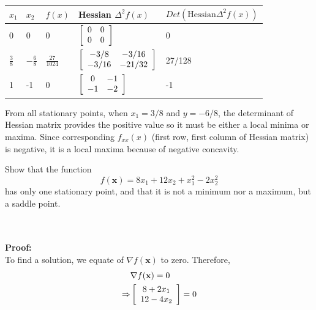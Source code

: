 \documentclass[a4paper,10pt]{article}
\begin{document}
\begin{enumerate}
\begin{center}
    \begin{tabular}{ | m{1em} | m{1em} | m{1cm} |  m{10em} | m{10em} | } 
      \hline
      $x_1$ & $x_2$ & $f(x)$ & Hessian $\Delta^2f(x)$ & $Det(\text{Hessian} \Delta^2f(x))$ \\ 
      \hline
      0 & 0 & 0 & $\left[\begin{array}{c c} 0  &0 \\ 0 &0 \end{array} \right]$ & 0 \\ 
      \hline
      $\frac{3}{8}$ &  $-\frac{6}{8}$ & $\frac{27}{1024}$ & $\left[\begin{array}{c c} -3/8  &-3/16 \\ -3/16 &-21/32 \end{array} \right]$ & 27/128 \\ 
      \hline
      1 & -1 & 0 & $\left[\begin{array}{c c} 0  &-1 \\ -1 &-2 \end{array} \right]$ & -1\\ 
      \hline
    \end{tabular}
    \end{center}
    From all stationary points, when $x_1 = 3/8$ and $y= -6/8$, the determinant of Hessian matrix provides the positive value so it must be either a local minima or maxima. Since corresponding $f_{xx}(x)$ (first row, first column of Hessian matrix) is negative, it is a local maxima because of negative concavity.
    \\
    \begin{taskbox}
    Show that the function 
    \begin{equation}
        f(\mathbf{x}) = 8x_1 + 12x_2 + x_1^2 - 2x^2_2
    \end{equation}
    has only one stationary point, and that it is not a minimum nor a maximum, but a saddle point.
    \end{taskbox}
    \\ \\ \textbf{Proof:} \\
    To find a solution, we equate  of $\nabla f(\mathbf{x})$ to zero.  Therefore,
    \begin{equation}
        \begin{split}
                & \nabla f(\mathbf{x}) = 0 \\
               \Rightarrow & \left[\begin{array}{c c} 8 + 2x_1 \\ 12-4x_2 \end{array} \right] = 0 \\

\end{split}
\end{equation}
\end{enumerate}
\end{document}
